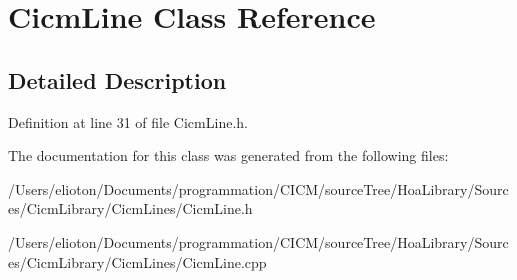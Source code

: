 \hypertarget{class_cicm_line}{\section{Cicm\-Line Class Reference}
\label{class_cicm_line}
}


\subsection{Detailed Description}


Definition at line 31 of file Cicm\-Line.\-h.



The documentation for this class was generated from the following files\-:\begin{DoxyCompactItemize}
\item 
/\-Users/elioton/\-Documents/programmation/\-C\-I\-C\-M/source\-Tree/\-Hoa\-Library/\-Sources/\-Cicm\-Library/\-Cicm\-Lines/Cicm\-Line.\-h\item 
/\-Users/elioton/\-Documents/programmation/\-C\-I\-C\-M/source\-Tree/\-Hoa\-Library/\-Sources/\-Cicm\-Library/\-Cicm\-Lines/Cicm\-Line.\-cpp\end{DoxyCompactItemize}
